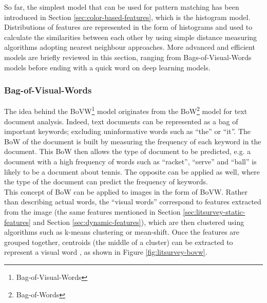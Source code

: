 So far, the simplest model that can be used for pattern matching has been introduced in Section \ref{sec:color-based-features}, which is the histogram model. Distributions of features are represented in the form of histograms and used to calculate the similarities between each other by using simple distance measuring algorithms adopting nearest neighbour approaches. More advanced and efficient models are briefly reviewed in this section, ranging from Bags-of-Visual-Words models before ending with a quick word on deep learning models.

\subsubsection{Bag-of-Visual-Words}

The idea behind the BoVW\footnote{Bag-of-Visual-Words} model originates from the BoW\footnote{Bag-of-Words} model for text document analysis. Indeed, text documents can be represented as a bag of important keywords; excluding uninformative words such as ``the'' or ``it''. The BoW of the document is built by measuring the frequency of each keyword in the document. This BoW then allows the type of document to be predicted, e.g. a document with a high frequency of words such as ``racket'', ``serve'' and ``ball'' is likely to be a document about tennis. The opposite can be applied as well, where the type of the document can predict the frequency of keywords.\\

This concept of BoW can be applied to images in the form of BoVW. Rather than describing actual words, the ``visual words'' correspond to features extracted from the image (the same features mentioned in Section \ref{sec:litsurvey-static-features} and Section \ref{sec:dynamic-features}), which are then clustered using algorithms such as k-means clustering or mean-shift. Once the features are grouped together, centroids (the middle of a cluster) can be extracted to represent a visual word \cite{yang2007bovw}, as shown in Figure \ref{fig:litsurvey-bovw}.\\

